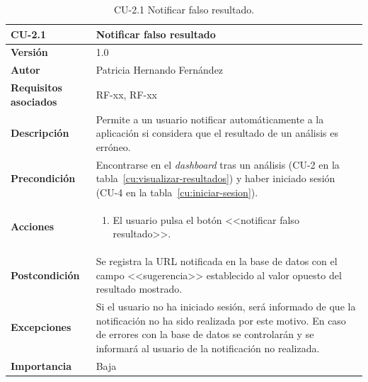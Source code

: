 \begin{table}[p]
	\centering
	\begin{tabularx}{\linewidth}{ p{} p{} }
		\toprule
		\textbf{CU-2.1}    & \textbf{Notificar falso resultado}\\
		\toprule
		\textbf{Versión}              & 1.0    \\
		\textbf{Autor}                & Patricia Hernando Fernández \\
		\textbf{Requisitos asociados} & RF-xx, RF-xx \\
		\textbf{Descripción}          & Permite a un usuario notificar automáticamente a la aplicación si considera que el resultado de un análisis es erróneo.\\
		\textbf{Precondición}         & Encontrarse en el \textit{dashboard} tras un análisis (CU-2 en la tabla~\ref{cu:visualizar-resultados}) y haber iniciado sesión (CU-4 en la tabla~\ref{cu:iniciar-sesion}).\\
		\textbf{Acciones}             &
		\begin{enumerate}
			\def\labelenumi{\arabic{enumi}.}
			\tightlist
			\item El usuario pulsa el botón <<notificar falso resultado>>.
		\end{enumerate}\\
		\textbf{Postcondición}        & Se registra la URL notificada en la base de datos con el campo <<sugerencia>> establecido al valor opuesto del resultado mostrado. \\
		\textbf{Excepciones}          & Si el usuario no ha iniciado sesión, será informado de que la notificación no ha sido realizada por este motivo. En caso de errores con la base de datos se controlarán y se informará al usuario de la notificación no realizada.\\
		\textbf{Importancia}          & Baja \\
		\bottomrule
	\end{tabularx}
	\caption{CU-2.1  Notificar falso resultado.}
	\label{cu:notificar-falso-resultado}
\end{table}


